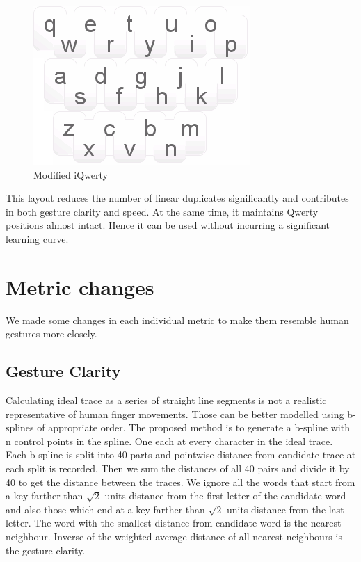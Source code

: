 \documentclass[MTech]{iitmdiss}
\begin{document}
\begin{figure}[h!]
	\centering
	\includegraphics[scale=1]{Images/iqmod}
	\caption{Modified iQwerty}
\end{figure}


This layout reduces the number of linear duplicates significantly and contributes in both gesture clarity and speed. At the same time, it maintains Qwerty positions almost intact. Hence it can be used without incurring a significant learning curve.

\section{Metric changes}
We made some changes in each individual metric to make them resemble human gestures more closely.
\subsection{Gesture Clarity}
Calculating ideal trace as a series of straight line segments is not a realistic representative of human finger movements. Those can be better modelled using b-splines of appropriate order.
The proposed method is to generate a b-spline with n control points in the spline. One each at every character in the ideal trace. Each b-spline is split into 40 parts and pointwise distance from candidate trace at each split is recorded. Then we sum the distances of all 40 pairs and divide it by 40 to get the distance between the traces. We ignore all the words that start from a key farther than $\sqrt{2}$ units distance from the first letter of the candidate word and also those which end at a key farther than $\sqrt{2}$ units distance from the last letter. The word with the smallest distance from candidate word is the nearest neighbour. Inverse of the weighted average distance of all nearest neighbours is the gesture clarity.
\end{document}
